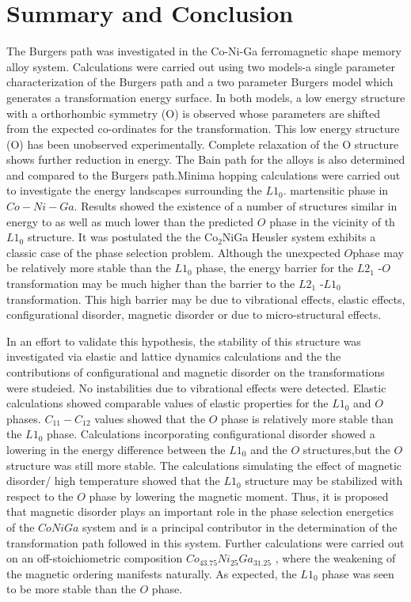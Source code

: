 \documentclass[%
preprint,
 amsmath,amssymb,
 aps,
prb,
showkeys,
]{revtex4-1}
\begin{document}
\section{Summary and Conclusion}
\label{Sec:summary}
 The Burgers path was investigated in the Co-Ni-Ga ferromagnetic shape memory alloy system. Calculations were carried out using two models-a single parameter characterization of the Burgers path and a two parameter Burgers model which generates a transformation energy surface. In both models, a low energy structure with a orthorhombic symmetry (O) is observed whose parameters are shifted from the expected co-ordinates for the transformation. This low energy structure (O) has been unobserved experimentally. Complete relaxation of the O structure shows further reduction in energy. The Bain path for the alloys is also determined and compared to the Burgers path.Minima hopping calculations were carried out to investigate the energy landscapes surrounding the $L1_0$. martensitic phase in $Co -  Ni - Ga$. Results showed the existence of a number of structures similar in energy to  as well as much lower than the predicted $O$ phase in the vicinity of th $L1_0$ structure. It was postulated the the Co$_2$NiGa  Heusler 
system exhibits a classic case of the phase selection problem. Although the  unexpected $O$phase may be relatively more stable than the $L1_0$ phase,  the energy barrier for the $L2_1$ -$O$ transformation may be much higher than the barrier to the $L2_1$ -$L1_0$ transformation.  This high barrier 
may be due to vibrational effects, elastic effects, configurational disorder, magnetic disorder or due to micro-structural effects.  

In an effort to validate this hypothesis, the stability of this structure was investigated via elastic and lattice dynamics calculations  and the the contributions of configurational and magnetic disorder on the transformations were studeied.  No instabilities due to vibrational effects were detected. Elastic calculations showed comparable values of elastic properties for the $L1_0$ and $O$ phases.  $C_{11}-C_{12}$ values showed that the $O$ phase is relatively more stable than the $L1_0$ phase. Calculations incorporating configurational disorder showed a lowering in the energy difference between the $L1_0$ and the $O$ structures,but the $O$ structure was still more stable. The calculations simulating the effect of magnetic disorder/ high temperature showed that the $L1_0$ structure may be stabilized with respect to the $O$ phase by lowering the magnetic moment. Thus,  it is proposed that magnetic disorder plays an important role in the phase selection energetics of the $CoNiGa$ system and is a principal contributor in the determination of the transformation path followed in this system. Further calculations were carried out on an off-stoichiometric composition $Co_{43.75}Ni_{25}Ga_{31.25}$ , where the weakening of the magnetic ordering manifests naturally. As expected, the $L1_0$ phase was seen to be more stable than the $O$ phase.
\end{document}
